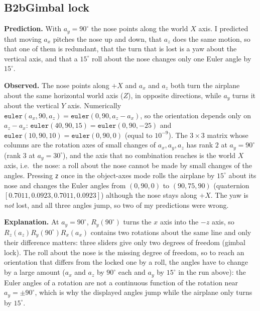 \documentclass[10pt,a4paper]{article}
\newcommand{\experiment}[5]{%
  \subsection*{#1\quad #2}
  \textbf{Prediction.} #3\par
  \textbf{Observed.} #4\par
  \textbf{Explanation.} #5\par
}
\begin{document}
\experiment{B2b}{Gimbal lock}
  {With $a_y=90^\circ$ the nose points along the world $X$ axis. I predicted that moving $a_x$ pitches the nose up
   and down, that $a_z$ does the same motion, so that one of them is redundant, that the turn that is lost is
   a yaw about the vertical axis, and that a $15^\circ$ roll about the nose changes only one Euler angle by $15^\circ$.}
  {The nose points along $+X$ and $a_x$ and $a_z$ both turn the airplane about the same horizontal world axis ($Z$),
   in opposite directions, while $a_y$ turns it about the vertical $Y$ axis. Numerically
   $\texttt{euler}(a_x,90,a_z)=\texttt{euler}(0,90,a_z-a_x)$, so the orientation depends only on $a_z-a_x$:
   $\texttt{euler}(40,90,15)=\texttt{euler}(0,90,-25)$ and $\texttt{euler}(10,90,10)=\texttt{euler}(0,90,0)$
   (equal to $10^{-9}$). The $3\times3$ matrix whose columns are the rotation axes of small changes of
   $a_x,a_y,a_z$ has rank $2$ at $a_y=90^\circ$ (rank $3$ at $a_y=30^\circ$), and the axis that no combination
   reaches is the world $X$ axis, i.e.\ the nose: a roll about the nose cannot be made by small changes of the
   angles. Pressing \texttt{z} once in the object-axes mode rolls the airplane by $15^\circ$ about its nose and
   changes the Euler angles from $(0,90,0)$ to $(90,75,90)$ (quaternion $[0.7011,0.0923,0.7011,0.0923]$) although
   the nose stays along $+X$. The yaw is \emph{not} lost, and all three angles jump, so two of my predictions
   were wrong.}
  {At $a_y=90^\circ$, $R_y(90^\circ)$ turns the $x$ axis into the $-z$ axis, so $R_z(a_z)R_y(90^\circ)R_x(a_x)$
   contains two rotations about the same line and only their difference matters: three sliders give only two
   degrees of freedom (gimbal lock). The roll about the nose is the missing degree of freedom, so to reach an
   orientation that differs from the locked one by a roll, the angles have to change by a large amount
   ($a_x$ and $a_z$ by $90^\circ$ each and $a_y$ by $15^\circ$ in the run above): the Euler angles of a rotation are
   not a continuous function of the rotation near $a_y=\pm90^\circ$, which is why the displayed angles jump
   while the airplane only turns by $15^\circ$.}
\end{document}

